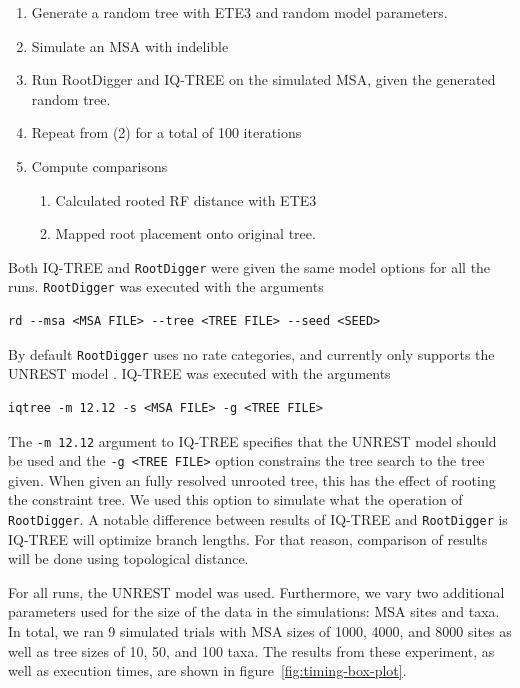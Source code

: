\documentclass{article}
\newcommand{\RootDiggertt}{\texttt{RootDigger}}
\begin{document}
\begin{enumerate} 
  \item Generate a random tree with ETE3
        \cite{huerta-cepas_ete_2016} and random model parameters.
  \item Simulate an MSA with indelible \cite{fletcher_indelible:_2009}
  \item Run RootDigger and IQ-TREE \cite{minh_iq-tree_2019} on the simulated
        MSA, given the generated random tree.
    \item Repeat from (2) for a total of 100 iterations
  \item Compute comparisons
        \begin{enumerate}
          \item Calculated rooted RF distance with ETE3
                \cite{robinson_comparison_1981}
          \item Mapped root placement onto original tree.
        \end{enumerate}
\end{enumerate}

Both IQ-TREE and \RootDiggertt{} were given the same model options for all the
runs. \RootDiggertt{} was executed with the arguments

\begin{verbatim}
rd --msa <MSA FILE> --tree <TREE FILE> --seed <SEED>
\end{verbatim}

By default \RootDiggertt{} uses no rate categories, and currently only supports
the UNREST model \cite{yang_estimating_1994}. IQ-TREE was executed with the
arguments

\begin{verbatim}
iqtree -m 12.12 -s <MSA FILE> -g <TREE FILE>
\end{verbatim}

The \texttt{-m 12.12} argument to IQ-TREE specifies that the UNREST model should
be used \cite{woodhams_new_2015} and the \texttt{-g <TREE FILE>} option
constrains the tree search to the tree given. When given an fully resolved
unrooted tree, this has the effect of rooting the constraint tree. We used this
option to simulate what the operation of \RootDiggertt{}. A notable difference
between results of IQ-TREE and \RootDiggertt{} is IQ-TREE will optimize
branch lengths. For that reason, comparison of results will be done using
topological distance.

For all runs, the UNREST model was used. Furthermore, we vary two additional
parameters used for the size of the data in the simulations: MSA sites and taxa.
In total, we ran 9 simulated trials with MSA sizes of 1000, 4000, and 8000 sites
as well as tree sizes of 10, 50, and 100 taxa. The results from these
experiment, as well as execution times, are shown in
figure~\ref{fig:timing-box-plot}.
\end{document}
